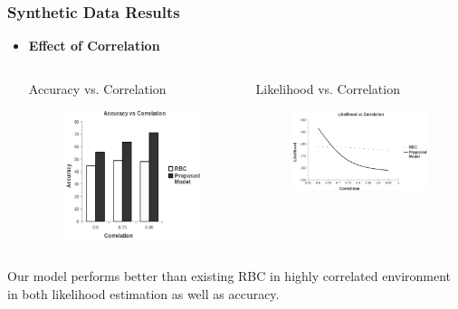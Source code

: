 \documentclass[10pt, blue,subsection=true, compress]{beamer}
\begin{document}
\begin{frame}\frametitle{Synthetic Data Results}
\begin{itemize}
\item \textbf{Effect of Correlation}
\begin{columns}[t]
\begin{block}{Accuracy vs. Correlation}
\begin{figure}[htbp]
\centering
\includegraphics[scale=0.25]{img//acc-c.eps}
\label{fig:4.1}
\end{figure}
\end{block}
\begin{block}{Likelihood vs. Correlation}
\begin{figure}[htbp]
\centering
\includegraphics[scale=0.25]{img/lh-c.eps}
\label{fig:4.2}
\end{figure}
\end{block}
\end{columns}
\end{itemize}
Our model performs better than existing RBC in highly correlated environment
in both likelihood estimation as well as accuracy.
\end{frame}
\end{document}
